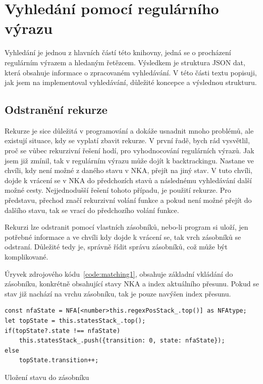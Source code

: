 \section{Vyhledání pomocí regulárního výrazu}\label{sec:PatternMatching}

Vyhledání je jednou z hlavních částí této knihovny, jedná se o procházení regulárním výrazem a hledaným řetězcem.
Výsledkem je struktura JSON dat, která obsahuje informace o zpracovaném vyhledávání.
V této části textu popisuji, jak jsem na implementoval vyhledávání, důležité koncepce a výslednou strukturu.

\subsection*{Odstranění rekurze}

Rekurze je sice důležitá v programování a dokáže usnadnit mnoho problémů, ale existují situace, kdy se vyplatí zbavit rekurze.
V první řadě, bych rád vysvětlil, proč se vůbec rekurzivní řešení hodí, pro vyhodnocování regulárních výrazů.
Jak jsem již zmínil, tak v regulárním výrazu může dojít k backtrackingu.
Nastane ve chvíli, kdy není možné z daného stavu v NKA, přejít na jiný stav.
V tuto chvíli, dojde k vrácení se v NKA do předchozích stavů a následnému vyhledávání další možné cesty.
Nejjednodušší řešení tohoto případu, je použití rekurze.
Pro představu, přechod značí rekurzivní volání funkce a pokud není možné přejít do dalšího stavu, tak se vrací do předchozího volání funkce.

Rekurzi lze odstranit pomocí vlastních zásobníků, nebo-li program si uloží, jen potřebné informace a ve chvíli kdy dojde k vrácení se, tak vrch zásobníků se odstraní.
Důležité tedy je, správně řídit správu zásobníků, což může být komplikované.

Úryvek zdrojového kódu~\ref{code:matching1}, obsahuje základní vkládání do zásobníku, konkrétně obsahující stavy NKA a index aktuálního přesunu.
Pokud se stav již nachází na vrchu zásobníku, tak je pouze navýšen index přesunu.

\begin{code}[!ht]
	\begin{verbatim}
const nfaState = NFA[<number>this.regexPosStack_.top()] as NFAtype;
let topState = this.statesStack_.top();
if(topState?.state !== nfaState)
	this.statesStack_.push({transition: 0, state: nfaState});
else
	topState.transition++;
	\end{verbatim}
	\caption{Uložení stavu do zásobníku}
	\label{code:matching1}
\end{code}

